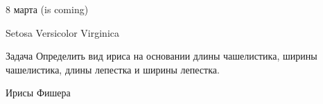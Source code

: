 \documentclass[10pt,a4paper]{beamer}
\begin{document}
\begin{frame}{8 марта (is coming)}
\begin{center}
\end{center}
{\large \hspace{4.5em} Setosa \hspace{3.3em} Versicolor \hspace{2.5em} Virginica}

\begin{exampleblock}{Задача}
Определить вид ириса на основании длины чашелистика, ширины чашелистика, длины лепестка и ширины лепестка.
\end{exampleblock}

\end{frame}


\begin{frame}{Ирисы Фишера}


\end{frame}
\end{document}
